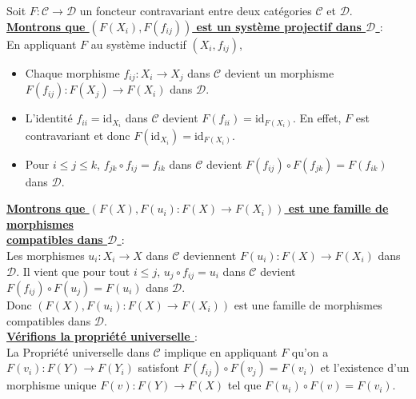 \documentclass[a4paper, 14pt]{report}
\begin{document}
\begin{onehalfspace}
{Soit \( F: \mathcal{C} \to \mathcal{D} \) un foncteur contravariant entre deux cat\'egories \( \mathcal{C} \) et \( \mathcal{D} \). \\

\textbf{\underline{Montrons que \( (F(X_i), F(f_{ij}) ) \) est un système projectif dans \( \mathcal{D} \) }}: \\

En appliquant \( F \) au système inductif \( (X_i, f_{ij}) \),  
\begin{itemize}
	\item Chaque morphisme \( f_{ij}: X_i \to X_j \) dans \( \mathcal{C} \) devient un morphisme \\
	\( F(f_{ij}): F(X_j) \to F(X_i) \) dans \( \mathcal{D} \).
	\item L'identité \( f_{ii} = \text{id}_{X_i} \) dans \( \mathcal{C} \) devient \( F(f_{ii}) = \text{id}_{F(X_i)} \). En effet, \( F \) est contravariant et donc \( F(\text{id}_{X_i}) = \text{id}_{F(X_i)} \).
	\item Pour \( i \leq j \leq k \), \( f_{jk} \circ f_{ij} = f_{ik} \) dans \( \mathcal{C} \) devient \( F(f_{ij}) \circ F(f_{jk}) = F(f_{ik}) \) dans \( \mathcal{D} \).
\end{itemize}

\textbf{\underline{Montrons que \( (F(X), F(u_{i}) : F(X) \to F(X_i) ) \) est une famille de morphismes }} \\

\textbf{\underline{compatibles dans \( \mathcal{D} \) }}: \\

Les morphismes \( u_i: X_i \to X \) dans \( \mathcal{C} \) deviennent  \( F(u_i) : F(X) \to F(X_i) \) dans \( \mathcal{D} \). Il vient que pour tout \( i \leq j \), \( u_j \circ f_{ij} = u_i \) dans \( \mathcal{C} \) devient \( F(f_{ij}) \circ F(u_j) = F(u_i) \) dans \( \mathcal{D} \).\\
Donc \( (F(X), F(u_{i}) : F(X) \to F(X_i) ) \) est une famille de morphismes compatibles dans \( \mathcal{D} \). \\

\textbf{\underline{Vérifions la propriété universelle }}: \\

La Propriété universelle dans \( \mathcal{C} \) implique en appliquant \( F \) qu'on a \( F(v_i): F(Y) \to F(Y_i) \) satisfont \( F(f_{ij}) \circ F(v_j) = F(v_i) \) et l'existence d'un morphisme unique \( F(v): F(Y) \to F(X) \) tel que \( F(u_i) \circ F(v) = F(v_i) \).\\

}
\end{onehalfspace}
\end{document}
